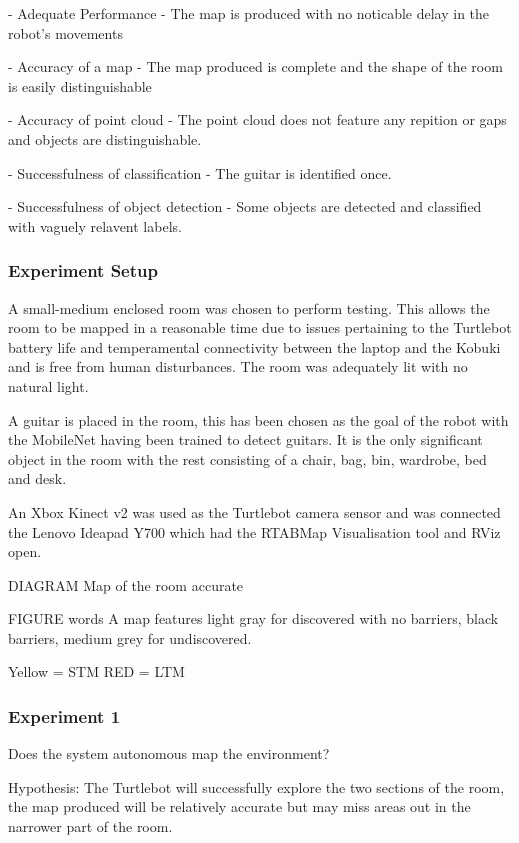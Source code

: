 \documentclass{mproj}
\begin{document}
- Adequate Performance - The map is produced with no noticable delay in the robot's movements 

- Accuracy of a map - The map produced is complete and the shape of the room is easily distinguishable

- Accuracy of point cloud - The point cloud does not feature any repition or gaps and objects are distinguishable.

- Successfulness of classification - The guitar is identified once.

- Successfulness of object detection - Some objects are detected and classified with vaguely relavent labels.

\subsubsection{Experiment Setup}

A small-medium enclosed room was chosen to perform testing. This allows the room to be mapped in a reasonable time due to issues pertaining to the Turtlebot battery life and temperamental connectivity between the laptop and the Kobuki and is free from human disturbances. The room was adequately lit with no natural light. 

A guitar is placed in the room, this has been chosen as the goal of the robot with the MobileNet having been trained to detect guitars. It is the only significant object in the room with the rest consisting of a chair, bag, bin, wardrobe, bed and desk.

An Xbox Kinect v2 was used as the Turtlebot camera sensor and was connected the Lenovo Ideapad Y700 which had the RTABMap Visualisation tool and RViz open.


DIAGRAM
Map of the room accurate

FIGURE words
A map features light gray for discovered with no barriers, black barriers, medium grey for undiscovered.

Yellow = STM
RED = LTM


\subsubsection{Experiment 1}

Does the system autonomous map the environment?

Hypothesis: The Turtlebot will successfully explore the two sections of the room, the map produced will be relatively accurate but may miss areas out in the narrower part of the room.
\end{document}
